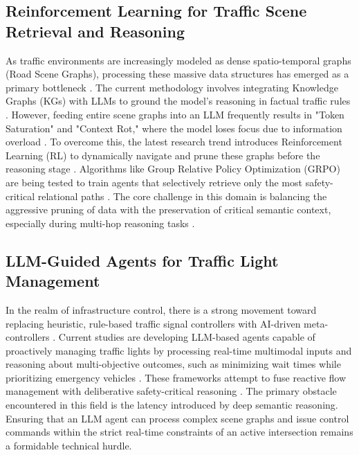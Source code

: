 \documentclass[a4paper, 12pt]{article}
\begin{document}
	\subsection{Reinforcement Learning for Traffic Scene Retrieval and Reasoning}
	As traffic environments are increasingly modeled as dense spatio-temporal graphs (Road Scene Graphs), processing these massive data structures has emerged as a primary bottleneck \cite{roadscene2vec2024, li2022spatio}. The current methodology involves integrating Knowledge Graphs (KGs) with LLMs to ground the model's reasoning in factual traffic rules \cite{pan2024kgllm, yasunaga2021qagnn}. However, feeding entire scene graphs into an LLM frequently results in "Token Saturation" and "Context Rot," where the model loses focus due to information overload \cite{hong2025contextrot, zhang2026recursive}. To overcome this, the latest research trend introduces Reinforcement Learning (RL) to dynamically navigate and prune these graphs before the reasoning stage \cite{edge2024graphrag, hu2024rlrag}. Algorithms like Group Relative Policy Optimization (GRPO) are being tested to train agents that selectively retrieve only the most safety-critical relational paths \cite{tencent2025grpo, chen2025pathrag}. The core challenge in this domain is balancing the aggressive pruning of data with the preservation of critical semantic context, especially during multi-hop reasoning tasks \cite{song2025plan, jiang2024graphllm}.
	
	\subsection{LLM-Guided Agents for Traffic Light Management}
	In the realm of infrastructure control, there is a strong movement toward replacing heuristic, rule-based traffic signal controllers with AI-driven meta-controllers \cite{ly2025enhancing}. Current studies are developing LLM-based agents capable of proactively managing traffic lights by processing real-time multimodal inputs and reasoning about multi-objective outcomes, such as minimizing wait times while prioritizing emergency vehicles \cite{shao2024lmdrive, wang2024knowledgedriven}. These frameworks attempt to fuse reactive flow management with deliberative safety-critical reasoning \cite{wang2025vlmlight, schmidt2025tls}. The primary obstacle encountered in this field is the latency introduced by deep semantic reasoning. Ensuring that an LLM agent can process complex scene graphs and issue control commands within the strict real-time constraints of an active intersection remains a formidable technical hurdle.
	
\end{document}
